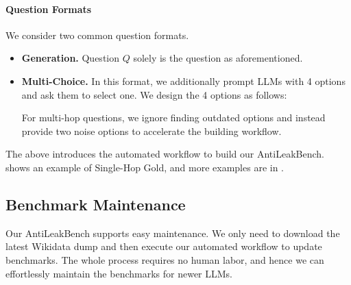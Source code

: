 \documentclass[11pt]{article}
\newcommand{\ie}{\emph{i.e.,}\xspace}
\newcommand{\eg}{\emph{e.g.,}\xspace}
\newcommand{\benchname}{{AntiLeakBench}\xspace}
\begin{document}
        \paragraph{Question Formats}
            We consider two common question formats.
            \begin{itemize}[leftmargin=*, itemsep=2pt]
                \item
                    \textbf{Generation.}
                    Question $Q$ solely is the question as aforementioned.
                \item
                    \textbf{Multi-Choice.}
                    In this format, we additionally prompt LLMs with 4 options and ask them to select one.
                    We design the 4 options as follows:
                    For multi-hop questions, we ignore finding outdated options and instead provide two noise options to accelerate the building workflow.
            \end{itemize}

        The above introduces the automated workflow to build our \benchname.
         shows an example of Single-Hop Gold, and more examples are in .




    \subsection{Benchmark Maintenance}
        Our \benchname supports easy maintenance.
        We only need to download the latest Wikidata dump and then execute our automated workflow to update benchmarks.
        The whole process requires no human labor, and hence we can effortlessly maintain the benchmarks for newer LLMs.
\end{document}
